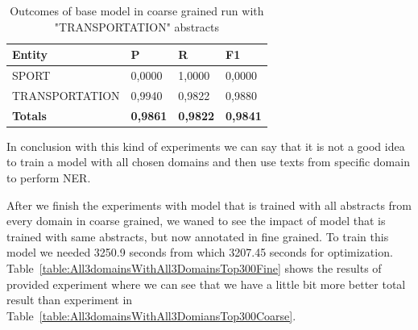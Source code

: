 \documentclass[thesis=M,english]{FITthesis}[2018/05/30]
\begin{document}
	\begin{table}[H]\centering
		\begin{tabular}{|l|l|l|l|}
			\hline {\textbf{Entity}} & {\textbf{P}} & {\textbf{R}} & {\textbf{F1}}\\\hline
				SPORT & 0,0000 & 1,0000 & 0,0000\\
				TRANSPORTATION & 0,9940 & 0,9822 & 0,9880\\\hline
				\textbf{Totals} & \textbf{0,9861} & \textbf{0,9822} & \textbf{0,9841}\\\hline
		\end{tabular}
	\caption{Outcomes of base model in coarse grained run with "TRANSPORTATION" abstracts \label{table:All3domainsWithTransportationTop300Coarse}}
	\end{table}	
	
	In conclusion with this kind of experiments we can say that it is not a good idea to train a model with all chosen domains and then use texts from specific domain to perform NER.
	
	After we finish the experiments with model that is trained with all abstracts from every domain in coarse grained, we waned to see the impact of model that is trained with same abstracts, but now annotated in fine grained. To train this model we needed 3250.9 seconds from which 3207.45 seconds for optimization. Table~\ref{table:All3domainsWithAll3DomainsTop300Fine} shows the results of provided experiment where we can see that we have a little bit more better total result than experiment in Table~\ref{table:All3domainsWithAll3DomiansTop300Coarse}.
\end{document}
